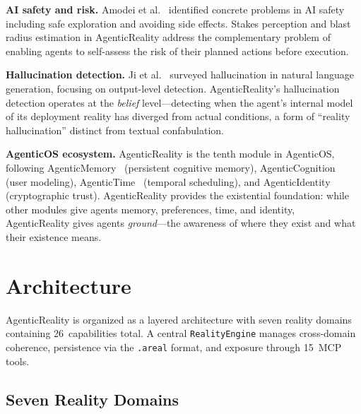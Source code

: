\documentclass[10pt, twocolumn]{article}
\begin{document}
\textbf{AI safety and risk.} Amodei et al.~\cite{amodei2016concrete} identified concrete problems in AI safety including safe exploration and avoiding side effects. Stakes perception and blast radius estimation in AgenticReality address the complementary problem of enabling agents to self-assess the risk of their planned actions before execution.

\textbf{Hallucination detection.} Ji et al.~\cite{ji2023survey} surveyed hallucination in natural language generation, focusing on output-level detection. AgenticReality's hallucination detection operates at the \emph{belief} level---detecting when the agent's internal model of its deployment reality has diverged from actual conditions, a form of ``reality hallucination'' distinct from textual confabulation.

\textbf{AgenticOS ecosystem.} AgenticReality is the tenth module in AgenticOS, following AgenticMemory~\cite{owolabi2026agenticmemory} (persistent cognitive memory), AgenticCognition~\cite{owolabi2026agenticcognition} (user modeling), AgenticTime~\cite{owolabi2026agentictime} (temporal scheduling), and AgenticIdentity~\cite{owolabi2026agenticidentity} (cryptographic trust). AgenticReality provides the existential foundation: while other modules give agents memory, preferences, time, and identity, AgenticReality gives agents \emph{ground}---the awareness of where they exist and what their existence means.


\section{Architecture}
\label{sec:architecture}

AgenticReality is organized as a layered architecture with seven reality domains containing 26~capabilities total. A central \texttt{RealityEngine} manages cross-domain coherence, persistence via the \texttt{.areal} format, and exposure through 15~MCP tools.

\subsection{Seven Reality Domains}
\label{sec:domains}
\end{document}
